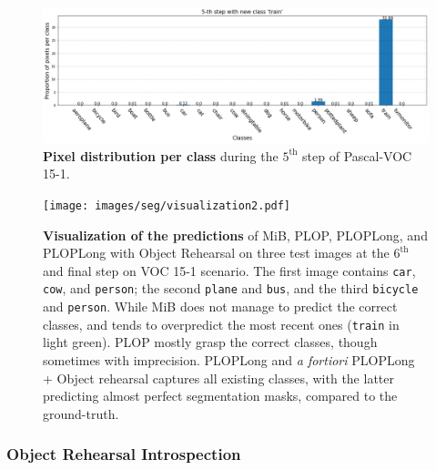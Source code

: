


\begin{figure}
    \centering
    \includegraphics[width=\linewidth]{images/seg/distribution_5step_voc.png}
    \vspace*{-0.3cm}
    \caption{\textbf{Pixel distribution per class} during the $5^{\text{th}}$ step of Pascal-VOC
        15-1.}
    \label{fig:seg_distribution_voc_5th}
\end{figure}

\begin{figure}
    \centering
    \texttt{[image: images/seg/visualization2.pdf]}
    \caption{\textbf{Visualization of the predictions} of MiB, PLOP, PLOPLong, and PLOPLong with
        Object Rehearsal on three test images at the $6^\text{th}$ and final step on VOC 15-1
        scenario. The first image contains \texttt{car}, \texttt{cow}, and \texttt{person}; the
        second \texttt{plane} and \texttt{bus}, and the third \texttt{bicycle} and \texttt{person}.
        While MiB does not manage to predict the correct classes, and tends to overpredict the most
        recent ones (\eg \texttt{train} in light green). PLOP mostly grasp the correct classes,
        though sometimes with imprecision. PLOPLong and \textit{a fortiori} PLOPLong + Object
        rehearsal captures all existing classes, with the latter predicting almost perfect
        segmentation masks, compared to the ground-truth.}
    \label{fig:seg_visualization}
\end{figure}

\subsubsection{Object Rehearsal Introspection}

